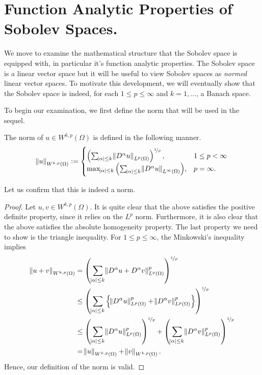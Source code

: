 \documentclass[10pt]{article}
\begin{document}
\section{Function Analytic Properties of Sobolev Spaces.}
We move to examine the mathematical structure that the Sobolev space is equipped with, in particular it's function analytic properties. The Sobolev space is a linear vector space but it will be useful to view Sobolev spaces as \textit{normed} linear vector spaces. To motivate this development, we will eventually show that the Sobolev space is indeed, for each $1 \leq p \leq \infty$ and $k = 1,\dots$, a Banach space. 

To begin our examination, we first define the norm that will be used in the sequel. 
\begin{definition}
	The norm of $u \in W^{k,p}(\Omega)$ is defined in the following manner.
	\begin{equation*}
		\displaystyle \norm{u}_{W^{k,p}(\Omega)} := \begin{cases}
			\left( \sum_{\abs{\alpha} \leq k}{\norm{D^\alpha u}_{L^p(\Omega)}} \right)^{\nicefrac{1}{p}}, & 1 \leq p < \infty \\
			\max_{\abs{\alpha}\leq k}{\left( \sum_{\abs{\alpha} \leq k}{\norm{D^\alpha u}_{L^\infty(\Omega)}} \right)}, & p = \infty.
		\end{cases}
	\end{equation*}
\end{definition}
Let us confirm that this is indeed a norm. 
\begin{proof}
	Let $u, v \in W^{k,p}(\Omega)$. It is quite clear that the above satisfies the positive definite property, since it relies on the $L^p$ norm. Furthermore, it is also clear that the above satisfies the absolute homogeneity property. The last property we need to show is the triangle inequality. For $1 \leq p \leq \infty$, the Minkowski's inequality implies 
	\begin{align*}
		\norm{u + v}_{W^{k,p}(\Omega)} &= \left( \sum_{\abs{\alpha}\leq k}{\norm{D^\alpha u + D^\alpha v}_{L^p(\Omega)}^p} \right)^{\nicefrac{1}{p}} \\
		&\leq \left( \sum_{\abs{\alpha}\leq k}{\left\{\norm{D^\alpha u}_{L^p(\Omega)}^p + \norm{D^\alpha v}_{L^p(\Omega)}^p \right\}} \right)^{\nicefrac{1}{p}} \\
		&\leq \left( \sum_{\abs{\alpha} \leq k}{\norm{D^\alpha u}_{L^p(\Omega)}^p} \right)^{\nicefrac{1}{p}} + \left( \sum_{\abs{\alpha} \leq k}{\norm{D^\alpha v}_{L^p(\Omega)}^p} \right)^{\nicefrac{1}{p}} \\
		&= \norm{u}_{W^{k,p}(\Omega)} + \norm{v}_{W^{k,p}(\Omega)}.
	\end{align*}
	Hence, our definition of the norm is valid. 
\end{proof}
\end{document}
